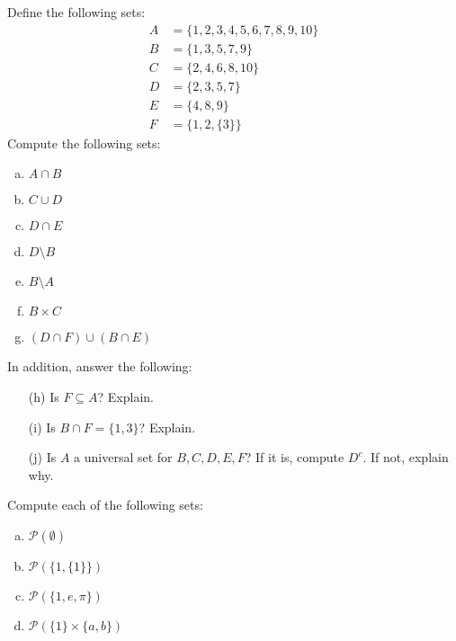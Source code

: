 \documentclass[11pt,letterpaper]{article}
\begin{document}
\newpage





 Define the following sets:
	\[
	\begin{aligned}
	A&= \{ 1, 2, 3, 4, 5, 6, 7, 8, 9, 10 \} \\
	B&= \{ 1, 3, 5, 7, 9 \} \\
	C&= \{ 2, 4, 6, 8, 10 \} \\
	D&= \{ 2, 3, 5, 7 \} \\
	E&= \{ 4, 8, 9 \} \\
	F&= \{ 1, 2, \{3\} \} 
	\end{aligned}
	\]
Compute the following sets:
	\begin{enumerate}[(a)] \itemsep=0.2ex
	\item $A \cap B$
	\item $C \cup D$
	\item $D \cap E$
	\item $D \setminus B$
	\item $B \setminus A$
	\item $B \times C$
	\item $(D \cap F) \cup (B \cap E)$
	\end{enumerate}
In addition, answer the following:
	\begin{enumerate} \itemsep=0.2ex
	\item[(h)] Is $F \subseteq A$? Explain. 
	\item[(i)] Is $B \cap F= \{ 1, 3 \}$? Explain. 
	\item[(j)] Is $A$ a universal set for $B, C, D, E, F$? If it is, compute $D^c$. If not, explain why. 
	\end{enumerate}





\newpage





 Compute each of the following sets:
        \begin{enumerate}[(a)]
        \item $\mathscr{P}(\emptyset)$
        \item $\mathscr{P}(\{ 1, \{ 1 \} \})$
        \item $\mathscr{P}(\{ 1, e, \pi \})$
        \item $\mathscr{P}( \{ 1 \} \times \{ a, b \})$
        \end{enumerate}
\end{document}
